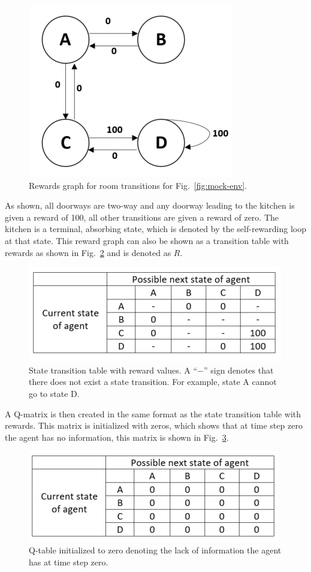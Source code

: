 \documentclass[12pt,american]{report}
\begin{document}
\begin{figure}
\centering
\includegraphics[scale=1]{images/mock-env-rewards.png}
\caption{Rewards graph for room transitions for Fig.~\ref{fig:mock-env}.}
\label{fig:mock-env-rewards}
\end{figure}
As shown, all doorways are two-way and any doorway leading to the kitchen is given a reward of 100, all other transitions are given a reward of zero.  The kitchen is a terminal, absorbing state, which is denoted by the self-rewarding loop at that state.  This reward graph can also be shown as a transition table with rewards as shown in Fig.~\ref{fig:q-mock-env-table} and is denoted as $R$. 
\begin{figure}
\centering
\includegraphics[scale=1]{images/q-mock-env-table.png}
\caption{State transition table with reward values. A ``$-$'' sign denotes that there does not exist a state transition. For example, state A cannot go to state D.}
\label{fig:q-mock-env-table}
\end{figure}
A Q-matrix is then created in the same format as the state transition table with rewards.  This matrix is initialized with zeros, which shows that at time step zero the agent has no information, this matrix is shown in Fig.~\ref{fig:mock-q-table}.
\begin{figure}
\centering
\includegraphics[scale=1]{images/mock-q-table.png}
\caption{Q-table initialized to zero denoting the lack of information the agent has at time step zero.}
\label{fig:mock-q-table}
\end{figure}
\end{document}
